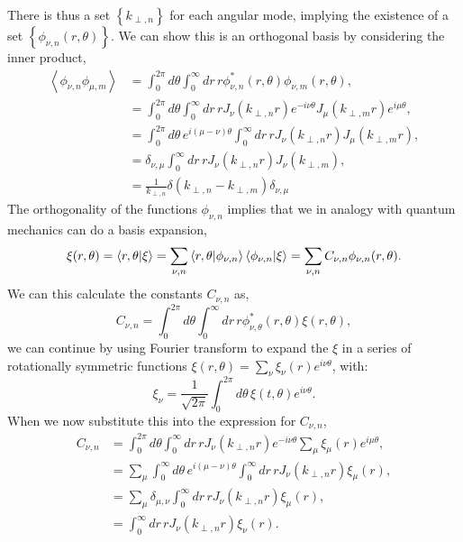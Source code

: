 \documentclass{article}
\begin{document}
There is thus a set $\left\{k_{\perp,n}\right\}$ for each angular mode, implying the existence of a set $\left\{\phi_{\nu,n}(r,\theta)\right\}$. We can show this is an orthogonal basis by considering the inner product,
\begin{align*}
  \left<\phi_{\nu,n}\phi_{\mu,m}\right>&=\int_0^{2\pi}d\theta\int_0^{\infty}dr\,r\phi^*_{\nu,n}(r,\theta)\phi_{\nu,m}(r,\theta),\\
  &=\int_0^{2\pi}d\theta\int_0^{\infty}dr\,rJ_{\nu}(k_{\perp,n}r)e^{-i\nu\theta}J_{\mu}(k_{\perp,m}r)e^{i\mu\theta},\\
  &=\int_0^{2\pi}d\theta\,e^{i(\mu-\nu)\theta}\int_0^{\infty}dr\,rJ_{\nu}(k_{\perp,n}r)J_{\mu}(k_{\perp,m}r),\\
  &=\delta_{\nu,\mu}\int_0^{\infty}dr\,rJ_{\nu}(k_{\perp,n}r)J_{\nu}(k_{\perp,m}),\\
  &=\frac{1}{k_{\perp,n}}\delta\left(k_{\perp,n}-k_{\perp,m}\right)\delta_{\nu,\mu}
\end{align*}
The orthogonality of the functions $\phi_{\nu,n}$ implies that we in analogy with quantum mechanics can do a basis expansion,
\begin{equation*}
  \xi(r,\theta)=\bra{r,\theta}\ket{\xi}=\sum_{\nu,n}\bra{r,\theta}\ket{\phi_{\nu,n}}\bra{\phi_{\nu,n}}\ket{\xi}=\sum_{\nu,n}C_{\nu,n}\phi_{\nu,n}(r,\theta).
\end{equation*}
We can this calculate the constants $C_{\nu,n}$ as,
\begin{equation*}
  C_{\nu,n}=\int_0^{2\pi}d\theta\int_0^{\infty}dr\,r\phi_{\nu,\theta}^*(r,\theta)\xi(r,\theta),
\end{equation*}
we can continue by using Fourier transform to expand the $\xi$ in a series of rotationally symmetric functions $\xi(r,\theta)=\sum_{\nu}\xi_{\nu}(r)e^{i\nu\theta}$, with:
\begin{equation*}
  \xi_{\nu}=\frac{1}{\sqrt{2\pi}}\int_0^{2\pi}d\theta\, \xi(t,\theta)e^{i\nu\theta}.
\end{equation*}
When we now substitute this into the expression for $C_{\nu,n}$,
\begin{align*}
  C_{\nu,n}&=\int_0^{2\pi}d\theta\int_0^{\infty}dr\,rJ_{\nu}(k_{\perp,n}r)e^{-i\nu\theta}\sum_{\mu}\xi_{\mu}(r)e^{i\mu\theta},\\
  &=\sum_{\mu}\int_0^{\infty}d\theta\,e^{i(\mu-\nu)\theta}\int_0^{\infty}dr\,rJ_{\nu}(k_{\perp,n}r)\xi_{\mu}(r),\\
  &=\sum_{\mu}\delta_{\mu,\nu}\int_0^{\infty}dr\,rJ_{\nu}(k_{\perp,n}r)\xi_{\mu}(r),\\
  &=\int_0^{\infty}dr\,rJ_{\nu}(k_{\perp,n}r)\xi_{\nu}(r).
\end{align*}
\end{document}
